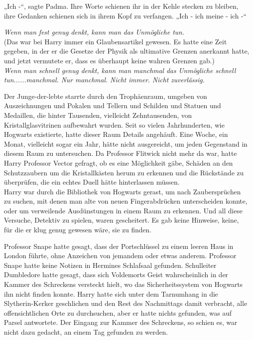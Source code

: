 {„Ich -“, sagte Padma. Ihre Worte schienen ihr in der Kehle stecken zu bleiben, ihre Gedanken schienen sich in ihrem Kopf zu verfangen. „Ich - ich meine - ich -“

\emph{Wenn man fest genug denkt, kann man das Unmögliche tun.}\\ (Das war bei Harry immer ein Glaubensartikel gewesen. Es hatte eine Zeit gegeben, in der er die Gesetze der Physik als ultimative Grenzen anerkannt hatte, und jetzt vermutete er, dass es überhaupt keine wahren Grenzen gab.)\\ \emph{Wenn man schnell genug denkt, kann man manchmal das Unmögliche schnell tun......manchmal. Nur manchmal. Nicht immer. Nicht zuverlässig.}

Der Junge-der-lebte starrte durch den Trophäenraum, umgeben von Auszeichnungen und Pokalen und Tellern und Schilden und Statuen und Medaillen, die hinter Tausenden, vielleicht Zehntausenden, von Kristallglasvitrinen aufbewahrt wurden. Seit so vielen Jahrhunderten, wie Hogwarts existierte, hatte dieser Raum Details angehäuft. Eine Woche, ein Monat, vielleicht sogar ein Jahr, hätte nicht ausgereicht, um jeden Gegenstand in diesem Raum zu untersuchen. Da Professor Flitwick nicht mehr da war, hatte Harry Professor Vector gefragt, ob es eine Möglichkeit gäbe, Schäden an den Schutzzaubern um die Kristallkästen herum zu erkennen und die Rückstände zu überprüfen, die ein echtes Duell hätte hinterlassen müssen.\\ Harry war durch die Bibliothek von Hogwarts gerast, um nach Zaubersprüchen zu suchen, mit denen man alte von neuen Fingerabdrücken unterscheiden konnte, oder um verweilende Ausdünstungen in einem Raum zu erkennen. Und all diese Versuche, Detektiv zu spielen, waren gescheitert. Es gab keine Hinweise, keine, für die er klug genug gewesen wäre, sie zu finden.

Professor Snape hatte gesagt, dass der Portschlüssel zu einem leeren Haus in London führte, ohne Anzeichen von jemandem oder etwas anderem. Professor Snape hatte keine Notizen in Hermines Schlafsaal gefunden. Schulleiter Dumbledore hatte gesagt, dass sich Voldemorts Geist wahrscheinlich in der Kammer des Schreckens versteckt hielt, wo das Sicherheitssystem von Hogwarts ihn nicht finden konnte. Harry hatte sich unter dem Tarnumhang in die Slytherin-Kerker geschlichen und den Rest des Nachmittags damit verbracht, alle offensichtlichen Orte zu durchsuchen, aber er hatte nichts gefunden, was auf Parsel antwortete. Der Eingang zur Kammer des Schreckens, so schien es, war nicht dazu gedacht, an einem Tag gefunden zu werden.

}
